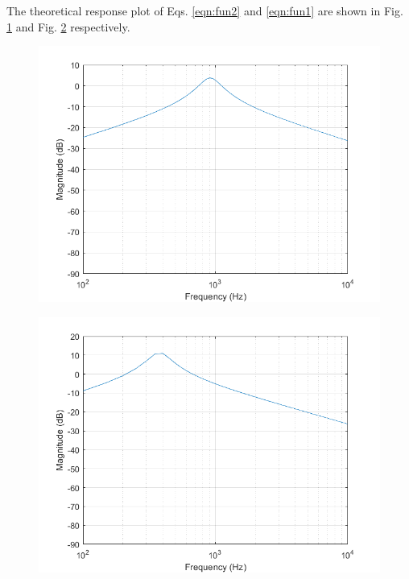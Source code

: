 \documentclass[hidelinks]{article}
\begin{document}
	\noindent The theoretical response plot of Eqs. \ref{eqn:fun2} and \ref{eqn:fun1} are shown in Fig. \ref{f:aResponse} and Fig. \ref{f:bResponse} respectively.
	\begin{figure}[htbp]
		\centering
		\includegraphics[width=0.6\textheight]{a_gain.png}
		\label{f:aResponse}
	\end{figure}
	\begin{figure}[htbp]
		\centering
		\includegraphics[width=0.6\textheight]{b_gain.png}
		\label{f:bResponse}
	\end{figure}	
	\pagebreak
\end{document}
